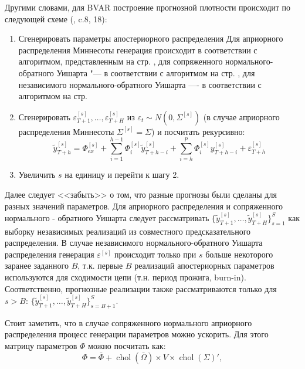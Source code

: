 \documentclass[11pt]{article} %
\DeclareMathOperator{\chol}{chol}
\begin{document}
Другими словами, для BVAR построение прогнозной плотности происходит по следующей схеме (\cite{karlsson_2012}, c.8, 18):
\begin{enumerate}
\item Сгенерировать параметры апостериорного распределения Для априорного распределения Миннесоты генерация происходит в соответствии с алгоритмом, представленным на стр. \pageref{alg:alg1}, для сопряженного нормального-обратного Уишарта  "--- в соответствии с алгоритмом на стр. \pageref{alg:alg2}, для независимого нормального-обратного Уишарта ---- в соответствии с алгоритмом на стр. \pageref{alg:alg3}
\item Сгенерировать $\varepsilon^{[s]}_{T+1},\ldots,\varepsilon^{[s]}_{T+H}$ из $\varepsilon_t\sim N(0,\Sigma^{[s]})$ (в случае априорного распределения Миннесоты $\Sigma^{[s]}=\Sigma$) и посчитать рекурсивно:
\begin{equation}
\tilde y_{T+h}^{[s]}=\Phi_{ex}^{[s]}+\sum_{i=1}^{h-1} \Phi_{i}^{[s]} \tilde y_{T+h-i}^{[s]}+\sum_{i=h}^{p} \Phi_{i}^{[s]} y_{T+h-i}^{[s]} +\varepsilon_{T+h}^{[s]}
\end{equation}
\item Увеличить $s$ на единицу и перейти к шагу 2.
\end{enumerate}
Далее следует <<забыть>> о том, что разные прогнозы были сделаны для разных значений параметров. Для априорного распределения и сопряженного нормального - обратного Уишарта  следует  рассматривать $\lbrace \tilde y_{T+1}^{[s]},\ldots,\tilde y_{T+H}^{[s]}\rbrace_{s=1}^{S}$ как выборку независимых реализаций из совместного предсказательного распределения. В случае  независимого нормального-обратного Уишарта распределения генерация $\varepsilon^{[s]}$ происходит только при $s$ больше некоторого заранее заданного $B$, т.к. первые $B$ реализаций апостериорных параметров используются для сходимости цепи (т.н. период прожига, burn-in). Соответственно,  прогнозные реализации также рассматриваются только для $s>B$: $\lbrace \tilde y_{T+1}^{[s]},\ldots,\tilde y_{T+H}^{[s]}\rbrace_{s=B+1}^{S}$.

Стоит заметить, что в случае сопряженного нормального априорного распределения процесс генерации параметров можно ускорить. Для этого матрицу параметров $\Phi$ можно посчитать как:
\begin{equation}
\Phi=\bar \Phi+\chol (\bar \Omega)\times V\times \chol(\Sigma)',
\end{equation}
\end{document}
